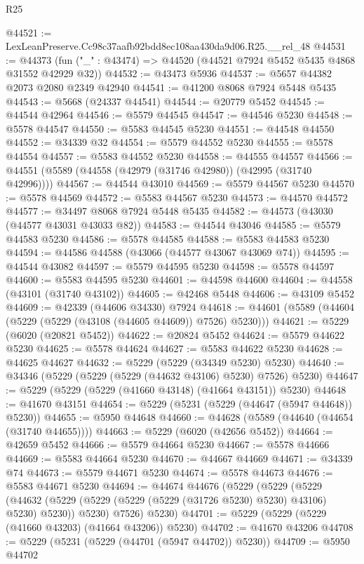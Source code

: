 \begin{lexlean}{R25}
\begin{coremodule}
@44521 := LexLeanPreserve.Cc98c37aafb92bdd8ec108aa430da9d06.R25.__rel_48
@44531 := @44373 (fun ("_" : @43474) => @44520 (@44521 @7924 @5452 @5435 @4868 @31552 @42929 @32))
@44532 := @43473 @5936
@44537 := @5657 @44382 @2073 @2080 @2349 @42940
@44541 := @41200 @8068 @7924 @5448 @5435
@44543 := @5668 (@24337 @44541)
@44544 := @20779 @5452
@44545 := @44544 @42964
@44546 := @5579 @44545
@44547 := @44546 @5230
@44548 := @5578 @44547
@44550 := @5583 @44545 @5230
@44551 := @44548 @44550
@44552 := @34339 @32
@44554 := @5579 @44552 @5230
@44555 := @5578 @44554
@44557 := @5583 @44552 @5230
@44558 := @44555 @44557
@44566 := @44551 (@5589 (@44558 (@42979 (@31746 @42980)) (@42995 (@31740 @42996))))
@44567 := @44544 @43010
@44569 := @5579 @44567 @5230
@44570 := @5578 @44569
@44572 := @5583 @44567 @5230
@44573 := @44570 @44572
@44577 := @34497 @8068 @7924 @5448 @5435
@44582 := @44573 (@43030 (@44577 @43031 @43033 @82))
@44583 := @44544 @43046
@44585 := @5579 @44583 @5230
@44586 := @5578 @44585
@44588 := @5583 @44583 @5230
@44594 := @44586 @44588 (@43066 (@44577 @43067 @43069 @74))
@44595 := @44544 @43082
@44597 := @5579 @44595 @5230
@44598 := @5578 @44597
@44600 := @5583 @44595 @5230
@44601 := @44598 @44600
@44604 := @44558 (@43101 (@31740 @43102))
@44605 := @42468 @5448
@44606 := @43109 @5452
@44609 := @42339 (@44606 @34330) @7924
@44618 := @44601 (@5589 (@44604 (@5229 (@5229 (@43108 (@44605 @44609)) @7526) @5230)))
@44621 := @5229 (@6020 (@20821 @5452))
@44622 := @20824 @5452
@44624 := @5579 @44622 @5230
@44625 := @5578 @44624
@44627 := @5583 @44622 @5230
@44628 := @44625 @44627
@44632 := @5229 (@5229 (@34349 @5230) @5230)
@44640 := @34346 (@5229 (@5229 (@5229 (@44632 @43106) @5230) @7526) @5230)
@44647 := @5229 (@5229 (@5229 (@41660 @43148) (@41664 @43151)) @5230)
@44648 := @41670 @43151
@44654 := @5229 (@5231 (@5229 (@44647 (@5947 @44648)) @5230))
@44655 := @5950 @44648
@44660 := @44628 (@5589 (@44640 (@44654 (@31740 @44655))))
@44663 := @5229 (@6020 (@42656 @5452))
@44664 := @42659 @5452
@44666 := @5579 @44664 @5230
@44667 := @5578 @44666
@44669 := @5583 @44664 @5230
@44670 := @44667 @44669
@44671 := @34339 @74
@44673 := @5579 @44671 @5230
@44674 := @5578 @44673
@44676 := @5583 @44671 @5230
@44694 := @44674
    @44676
    (@5229
      (@5229
        (@5229
          (@44632 (@5229 (@5229 (@5229 (@5229 (@31726 @5230) @5230) @43106) @5230) @5230))
          @5230)
        @7526)
      @5230)
@44701 := @5229 (@5229 (@5229 (@41660 @43203) (@41664 @43206)) @5230)
@44702 := @41670 @43206
@44708 := @5229 (@5231 (@5229 (@44701 (@5947 @44702)) @5230))
@44709 := @5950 @44702

\end{coremodule}
\end{lexlean}
